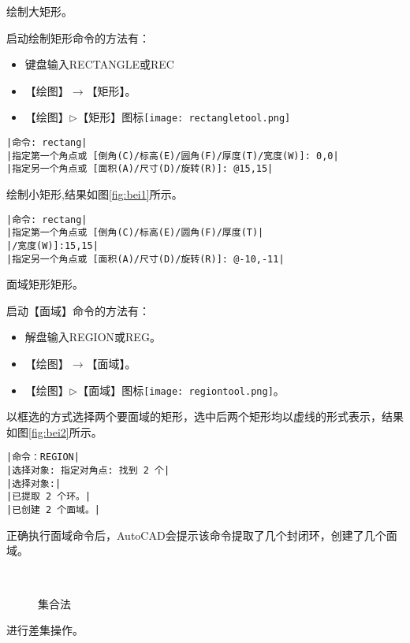 \begin{procedure}
\item 绘制大矩形。

启动绘制矩形命令的方法有：
\begin{itemize}
\item 键盘输入RECTANGLE或REC
\item 【绘图】$\rightarrow$【矩形】。
\item 【绘图】$\triangleright$【矩形】图标\texttt{[image: rectangletool.png]}
\end{itemize}
\begin{lstlisting}
|命令: rectang|
|指定第一个角点或 [倒角(C)/标高(E)/圆角(F)/厚度(T)/宽度(W)]: 0,0|
|指定另一个角点或 [面积(A)/尺寸(D)/旋转(R)]: @15,15|
\end{lstlisting}
\item 绘制小矩形,结果如图\ref{fig:bei1}所示。
\begin{lstlisting}
|命令: rectang|
|指定第一个角点或 [倒角(C)/标高(E)/圆角(F)/厚度(T)|
|/宽度(W)]:15,15|
|指定另一个角点或 [面积(A)/尺寸(D)/旋转(R)]: @-10,-11|
\end{lstlisting}
\item 面域矩形矩形。

启动【面域】命令的方法有：
\begin{itemize}
\item 解盘输入REGION或REG。
\item 【绘图】$\rightarrow$【面域】。
\item 【绘图】$\triangleright$【面域】图标\texttt{[image: regiontool.png]}。
\end{itemize}
以框选的方式选择两个要面域的矩形，选中后两个矩形均以虚线的形式表示，结果如图\ref{fig:bei2}所示。
\begin{lstlisting}
|命令：REGION|
|选择对象: 指定对角点: 找到 2 个|
|选择对象:|
|已提取 2 个环。|
|已创建 2 个面域。|
\end{lstlisting}
正确执行面域命令后，AutoCAD会提示该命令提取了几个封闭环，创建了几个面域。
\begin{figure}[htbp]
\centering
{}\hspace{20pt}
\hspace{20pt}
\\
\hspace{20pt}
\caption{集合法}
\end{figure}
\item 进行差集操作。


\end{procedure}
